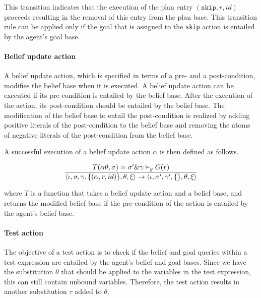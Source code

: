 \documentclass[a4paper]{article}
\begin{document}
This transition indicates that the execution of the plan entry $(\texttt{skip}, r, id)$ proceeds resulting in the removal of this entry from the plan base. This transition rule can be applied only if the goal that is assigned to the \texttt{skip} action is entailed by the agent's goal base.

\paragraph{Belief update action}

A belief update action, which is specified in terms of a pre- and a post-condition, modifies the belief base when it is executed. A belief update action can be executed if its pre-condition is entailed by the belief base. After the execution of the action, its post-condition should be entailed by the belief base. The modification of the belief base to entail the post-condition is realized by adding positive literals of the post-condition to the belief base and removing the atoms of negative literals of the post-condition from the belief base.

A successful execution of a belief update action $\alpha$ is then defined as follows.

$$ {{T(\alpha \theta, \sigma) = \sigma' \& \gamma \vDash_{g} G(r)} \over {\langle \iota, \sigma, \gamma, \{(\alpha, r, id)\}, \theta, \xi \rangle  \rightarrow \langle \iota, \sigma', \gamma', \{\}, \theta, \xi \rangle}} $$

where $T$ is a function that takes a belief update action and a belief base, and returns the modified belief base if the pre-condition of the action is entailed by the agent's belief base.


\paragraph{Test action}

The objective of a test action is to check if the belief and goal queries within a test expression are entailed by the agent's belief and goal bases. Since we have the substitution $\theta$ that should be applied to the variables in the test expression, this can still contain unbound variables. Therefore, the test action results in another substitution $\tau$ added to $\theta$.
\end{document}
